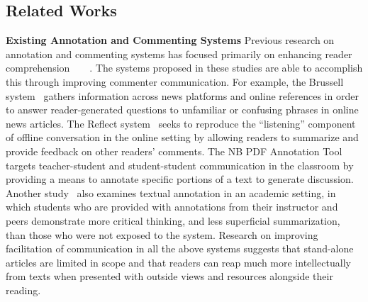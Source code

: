\subsection{Related Works}
\textbf{Existing Annotation and Commenting Systems}
Previous research on annotation and commenting systems has focused primarily on enhancing reader comprehension~\cite{NewsInterfaces}~\cite{Reflect}~\cite{NB}~\cite{AnnotationsStudents}. The systems proposed in these studies are able to accomplish this through improving commenter communication. For example, the Brussell system~\cite{NewsInterfaces} gathers information across news platforms and online references in order to answer reader-generated questions to unfamiliar or confusing phrases in online news articles. The Reflect system~\cite{Reflect} seeks to reproduce the “listening” component of offline conversation in the online setting by allowing readers to summarize and provide feedback on other readers’ comments. The NB PDF Annotation Tool~\cite{NB} targets teacher-student and student-student communication in the classroom by providing a means to annotate specific portions of a text to generate discussion. Another study~\cite{AnnotationsStudents} also examines textual annotation in an academic setting, in which students who are provided with annotations from their instructor and peers demonstrate more critical thinking, and less superficial summarization, than those who were not exposed to the system. Research on improving facilitation of communication in all the above systems suggests that stand-alone articles are limited in scope and that readers can reap much more intellectually from texts when presented with outside views and resources alongside their reading.

